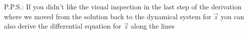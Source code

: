 P.P.S.: If you didn't like the visual inspection in the last step of the derivation where we moved from the solution back to the dynamical system for $\vec{z}$ you can also derive the differential equation for $\vec{z}$ along the lines 

